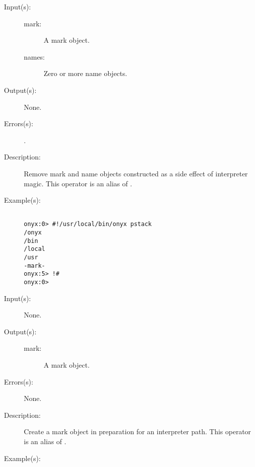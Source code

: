 \begin{description}
\label{systemdict:sym_bang_hash}
\item[{\onyxop{mark names}{!\#}{--}}: ]
	\begin{description}\item[]
	\item[Input(s): ]
		\begin{description}\item[]
		\item[mark: ]
			A mark object.
		\item[names: ]
			Zero or more name objects.
		\end{description}
	\item[Output(s): ] None.
	\item[Errors(s): ]
		\begin{description}\item[]
		\item[.]
		\end{description}
	\item[Description: ]
		Remove mark and name objects constructed as a side effect of
		interpreter magic.  This operator is an alias of
		.
	\item[Example(s): ]\begin{verbatim}

onyx:0> #!/usr/local/bin/onyx pstack
/onyx
/bin
/local
/usr
-mark-
onyx:5> !#
onyx:0>
		\end{verbatim}
	\end{description}
\label{systemdict:sym_hash_bang}
\item[{\onyxop{--}{\#!}{mark}}: ]
	\begin{description}\item[]
	\item[Input(s): ] None.
	\item[Output(s): ]
		\begin{description}\item[]
		\item[mark: ]
			A mark object.
		\end{description}
	\item[Errors(s): ] None.
	\item[Description: ]
		Create a mark object in preparation for an interpreter path.
		This operator is an alias of .
	\item[Example(s): ]\begin{verbatim}


\end{verbatim}
\end{description}
\end{description}
